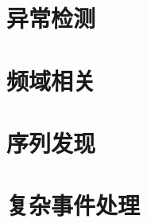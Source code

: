 \documentclass[cn,11pt,mode=simple,table]{elegantbook}
\begin{document}
\chapter{异常检测}








\chapter{频域相关}







\chapter{序列发现}




\chapter{复杂事件处理}







\end{document}
